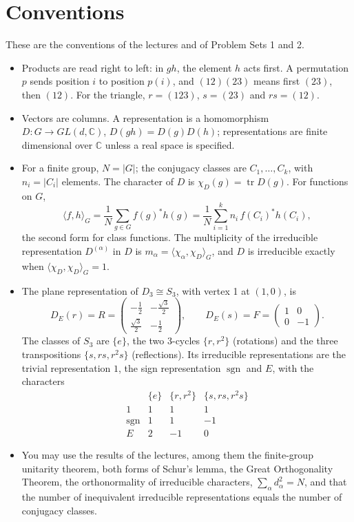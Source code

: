 \documentclass[11pt,a4paper]{article}
\newcommand{\C}{\mathbb{C}}
\DeclareMathOperator{\sgn}{sgn}
\DeclareMathOperator{\tr}{tr}
\begin{document}
\section*{\large Conventions}
These are the conventions of the lectures and of Problem Sets 1 and 2.
\begin{itemize}
  \item Products are read right to left: in $gh$, the element $h$ acts first. A permutation $p$ sends position $i$ to position $p(i)$, and $(12)(23)$ means first $(23)$, then $(12)$. For the triangle, $r = (123)$, $s = (23)$ and $rs = (12)$.
  \item Vectors are columns. A representation is a homomorphism $D\colon G \to GL(d, \C)$, $D(gh) = D(g)D(h)$; representations are finite dimensional over $\C$ unless a real space is specified.
  \item For a finite group, $N = |G|$; the conjugacy classes are $C_1, \dots, C_k$, with $n_i = |C_i|$ elements. The character of $D$ is $\chi_D(g) = \tr D(g)$. For functions on $G$,
  \[
    \langle f, h\rangle_G = \frac{1}{N}\sum_{g \in G} f(g)^* h(g) = \frac{1}{N}\sum_{i=1}^{k} n_i\, f(C_i)^* h(C_i),
  \]
  the second form for class functions. The multiplicity of the irreducible representation $D^{(\alpha)}$ in $D$ is $m_\alpha = \langle \chi_\alpha, \chi_D\rangle_G$, and $D$ is irreducible exactly when $\langle \chi_D, \chi_D\rangle_G = 1$.
  \item The plane representation of $D_3 \cong S_3$, with vertex 1 at $(1, 0)$, is
  \[
    D_E(r) = R = \begin{pmatrix} -\tfrac12 & -\tfrac{\sqrt3}{2} \\[2pt] \tfrac{\sqrt3}{2} & -\tfrac12 \end{pmatrix}, \qquad
    D_E(s) = F = \begin{pmatrix} 1 & 0 \\ 0 & -1 \end{pmatrix}.
  \]
  The classes of $S_3$ are $\{e\}$, the two 3-cycles $\{r, r^2\}$ (rotations) and the three transpositions $\{s, rs, r^2 s\}$ (reflections). Its irreducible representations are the trivial representation $1$, the sign representation $\sgn$ and $E$, with the characters
  \[
    \begin{array}{c|ccc}
      & \{e\} & \{r, r^2\} & \{s, rs, r^2 s\} \\ \hline
      1 & 1 & 1 & 1 \\
      \sgn & 1 & 1 & -1 \\
      E & 2 & -1 & 0
    \end{array}
  \]
  \item You may use the results of the lectures, among them the finite-group unitarity theorem, both forms of Schur's lemma, the Great Orthogonality Theorem, the orthonormality of irreducible characters, $\sum_\alpha d_\alpha^2 = N$, and that the number of inequivalent irreducible representations equals the number of conjugacy classes.
\end{itemize}
\end{document}
